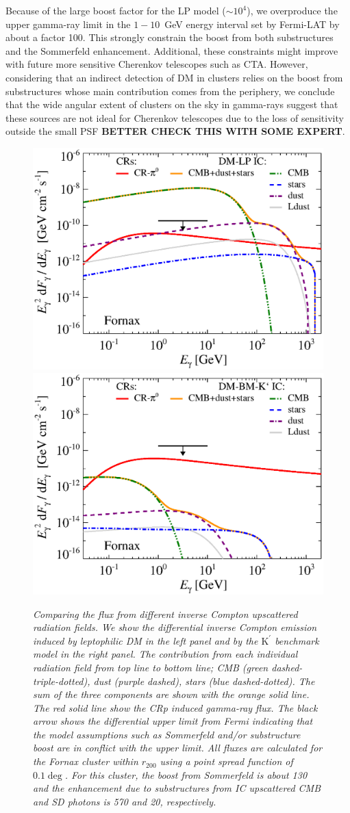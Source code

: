 \documentclass[10pt,aps,pra,reprint,amsmath,amsfonts,amssymb,showpacs,nofootinbib,floatfix]{revtex4-1}
\newcommand{\rmn}{\mathrm}
\newcommand{\Kp}{\rmn{K}^\prime}
\newcommand{\rvir}{r_{200}}
\begin{document}
Because of the large boost factor for the LP model ($\sim 10^4$), we
overproduce the upper gamma-ray limit in the $1-10$~GeV energy
interval set by Fermi-LAT by about a factor 100. This strongly
constrain the boost from both substructures and the Sommerfeld
enhancement. Additional, these constraints might improve with future
more sensitive Cherenkov telescopes such as CTA. However, considering
that an indirect detection of DM in clusters relies on the boost from
substructures whose main contribution comes from the periphery, we
conclude that the wide angular extent of clusters on the sky in
gamma-rays suggest that these sources are not ideal for Cherenkov
telescopes due to the loss of sensitivity outside the small PSF
{\bf BETTER CHECK THIS WITH SOME EXPERT}.

\begin{figure}
\begin{minipage}{2.0\columnwidth}
\includegraphics[width=0.49\columnwidth]{figures/flux.IRcomp.v11.0.1deg.1.6T.SubMass.elmu.SF300.noMW.woGal.eps}
\includegraphics[width=0.49\columnwidth]{figures/flux.IRcomp.BMv11.0.1deg.SubMass.noMW.woGal.eps}
\caption{\it Comparing the flux from different inverse Compton
  upscattered radiation fields. We show the differential inverse
  Compton emission induced by leptophilic DM in the left panel and by
  the $\Kp$ benchmark model in the right panel. The contribution from
  each individual radiation field from top line to bottom line; CMB
  (green dashed-triple-dotted), dust (purple dashed), stars (blue
  dashed-dotted). The sum of the three components are shown with the
  orange solid line.  The red solid line show the CRp induced
  gamma-ray flux. The black arrow shows the differential upper limit
  from Fermi \cite{2010ApJ...717L..71A} indicating that the model
  assumptions such as Sommerfeld and/or substructure boost are in
  conflict with the upper limit. All fluxes are calculated for the
  Fornax cluster within $\rvir$ using a point spread function of
  $0.1\deg$. For this cluster, the boost from Sommerfeld is about 130
  and the enhancement due to substructures from IC upscattered CMB and
  SD photons is 570 and 20, respectively.}
 \label{fig:IR_comp}
\end{minipage}
\end{figure}
\end{document}
